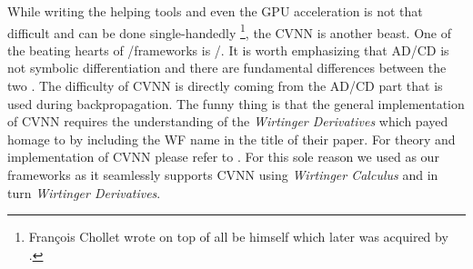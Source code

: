 While writing the helping tools and even the \ac{GPU} acceleration is not that difficult and can be done single-handedly
\footnote{Fran\c{c}ois Chollet wrote \keras\cite{Chollet2023} on top of \tensorflow\cite{Abadi2016} all be himself which later was acquired by \google.}, the \ac{CVNN} is another beast. 
One of the beating hearts of \ml/\dl frameworks is \ad/\cd. It is worth emphasizing that \ac{AD}/\ac{CD} is not symbolic differentiation and there are fundamental differences between the two \cite{Naumann2011}\cite{Griewank2008}. 
The difficulty of \ac{CVNN}\cite{CTOBYZDSSSJFSSMNRYBCP2017}\cite{Bassey2021}\cite{Barrachina2023} is directly coming from the \ac{AD}/\ac{CD} part 
that is used during backpropagation. The funny thing is that the general implementation of \ac{CVNN} requires the understanding of the 
\emph{Wirtinger Derivatives}\cite{Wirtinger1927} which \cite{Candes2014} payed homage to by including the \ac{WF} name in the title of their paper\cite{Candes2014}. 
For theory and implementation of \ac{CVNN} please refer to \cite{Wirtinger1927}\cite{KreutzDelgado2009}\cite{Bassey2021}\cite{Barrachina2023}\cite{CTOBYZDSSSJFSSMNRYBCP2017}. For this sole reason 
we used \pytorch\cite{Paszke2019} as our frameworks as it seamlessly supports \ac{CVNN} using \emph{Wirtinger Calculus}\cite{Fischer2002} and in turn 
\emph{Wirtinger Derivatives}\cite{Wirtinger1927}.







